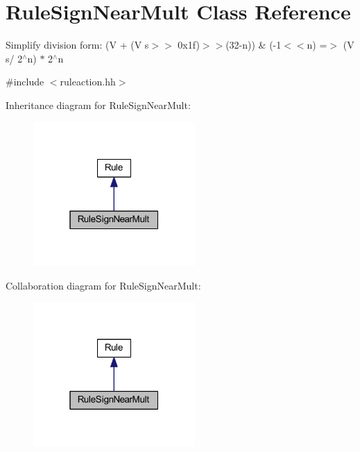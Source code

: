 \hypertarget{class_rule_sign_near_mult}{}\section{Rule\+Sign\+Near\+Mult Class Reference}
\label{class_rule_sign_near_mult}


Simplify division form\+: {\ttfamily (V + (V s$>$$>$ 0x1f)$>$$>$(32-\/n)) \& (-\/1$<$$<$n) =$>$ (V s/ 2$^\wedge$n) $\ast$ 2$^\wedge$n}  




{\ttfamily \#include $<$ruleaction.\+hh$>$}



Inheritance diagram for Rule\+Sign\+Near\+Mult\+:
\nopagebreak
\begin{figure}[H]
\begin{center}
\leavevmode
\includegraphics[width=175pt]{class_rule_sign_near_mult__inherit__graph}
\end{center}
\end{figure}


Collaboration diagram for Rule\+Sign\+Near\+Mult\+:
\nopagebreak
\begin{figure}[H]
\begin{center}
\leavevmode
\includegraphics[width=175pt]{class_rule_sign_near_mult__coll__graph}
\end{center}
\end{figure}
